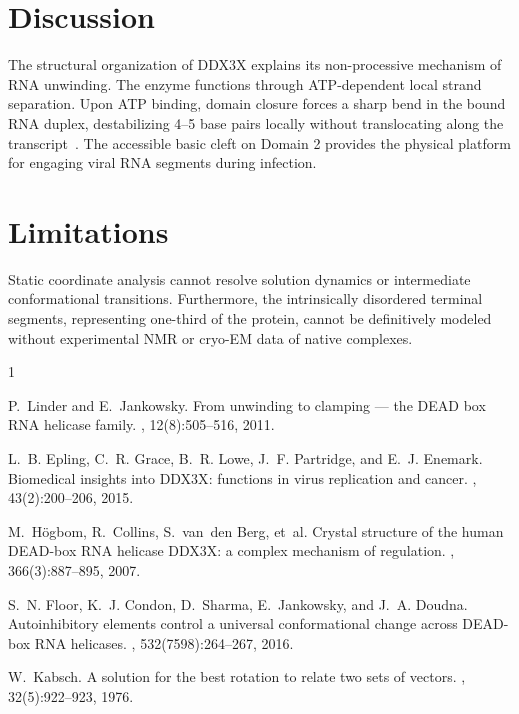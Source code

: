 \documentclass[11pt,a4paper]{article}
\begin{document}
\section{Discussion}
The structural organization of DDX3X explains its non-processive mechanism of RNA unwinding. The enzyme functions through ATP-dependent local strand separation. Upon ATP binding, domain closure forces a sharp bend in the bound RNA duplex, destabilizing 4--5 base pairs locally without translocating along the transcript~\cite{linder2011}. The accessible basic cleft on Domain 2 provides the physical platform for engaging viral RNA segments during infection.

\section{Limitations}
Static coordinate analysis cannot resolve solution dynamics or intermediate conformational transitions. Furthermore, the intrinsically disordered terminal segments, representing one-third of the protein, cannot be definitively modeled without experimental NMR or cryo-EM data of native complexes.


\begin{thebibliography}{1}

P.~Linder and E.~Jankowsky.
\newblock From unwinding to clamping --- the {DEAD} box {RNA} helicase family.
, 12(8):505--516, 2011.

L.~B. Epling, C.~R. Grace, B.~R. Lowe, J.~F. Partridge, and E.~J. Enemark.
\newblock Biomedical insights into {DDX3X}: functions in virus replication and cancer.
, 43(2):200--206, 2015.

M.~H{\"o}gbom, R.~Collins, S.~van~den Berg, et~al.
\newblock Crystal structure of the human {DEAD}-box {RNA} helicase {DDX3X}: a complex mechanism of regulation.
, 366(3):887--895, 2007.

S.~N. Floor, K.~J. Condon, D.~Sharma, E.~Jankowsky, and J.~A. Doudna.
\newblock Autoinhibitory elements control a universal conformational change across {DEAD}-box {RNA} helicases.
, 532(7598):264--267, 2016.

W.~Kabsch.
\newblock A solution for the best rotation to relate two sets of vectors.
, 32(5):922--923, 1976.

\end{thebibliography}
\end{document}
